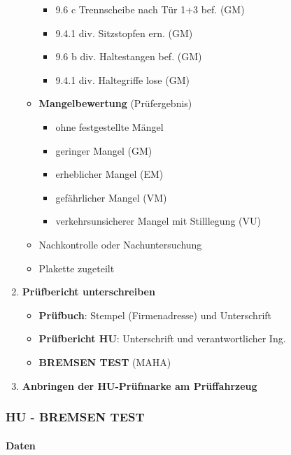 \documentclass{vorlage-design-main}
\begin{document}
\begin{enumerate}
\begin{itemize}
    \begin{itemize}
    
    \item
      9.6 c Trennscheibe nach Tür 1+3 bef. (GM)
    \item
      9.4.1 div. Sitzstopfen ern. (GM)
    \item
      9.6 b div. Haltestangen bef. (GM)
    \item
      9.4.1 div. Haltegriffe lose (GM)
    \end{itemize}
  \item
    \textbf{Mangelbewertung} (Prüfergebnis)

    \begin{itemize}
    
    \item
      ohne festgestellte Mängel
    \item
      geringer Mangel (GM)
    \item
      erheblicher Mangel (EM)
    \item
      gefährlicher Mangel (VM)
    \item
      verkehrsunsicherer Mangel mit Stilllegung (VU)
    \end{itemize}
  \item
    Nachkontrolle oder Nachuntersuchung
  \item
    Plakette zugeteilt
  \end{itemize}
\item
  \textbf{Prüfbericht unterschreiben}

  \begin{itemize}
  
  \item
    \textbf{Prüfbuch}: Stempel (Firmenadresse) und Unterschrift
  \item
    \textbf{Prüfbericht HU}: Unterschrift und verantwortlicher Ing.
  \item
    \textbf{BREMSEN TEST} (MAHA)
  \end{itemize}
\item
  \textbf{Anbringen der HU-Prüfmarke am Prüffahrzeug}
\end{enumerate}

\subsubsection{HU - BREMSEN TEST}\label{hu---bremsen-test}

\paragraph{Daten}\label{daten}
\end{document}
